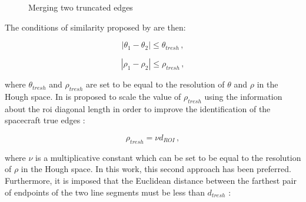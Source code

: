 \begin{figure}[htbp]
  \centering
  \qquad
  \qquad
  \caption{Merging two truncated edges \cite{Sharma2018}}
  \label{fig:mergeEdges}
\end{figure}

The conditions of similarity proposed by \cite{Sharma2018} are then:

\begin{equation}
|\theta_1 - \theta_2| \leqslant	\theta_{tresh} \,,
\end{equation}

\begin{equation}
|\rho_1 - \rho_2| \leqslant	\rho_{tresh} \,,
\end{equation}

where $\theta_{tresh}$ and $\rho_{tresh}$ are set to be equal to the resolution of $\theta$ and $\rho$ in the Hough space. In \cite{fracchio2019} is proposed to scale the value of $\rho_{tresh}$ using the information about the \acrshort{roi} diagonal length in order to improve the identification of the spacecraft true edges :

\begin{equation}
\rho_{tresh} = \nu d_{ROI} \,,
\end{equation}

where $\nu$ is a multiplicative constant which can be set to be equal to the resolution of $\rho$ in the Hough space. In this work, this second approach has been preferred. 
Furthermore, it is imposed that the Euclidean distance between the farthest pair of endpoints of the two line segments must be less than $d_{tresh}$ :

